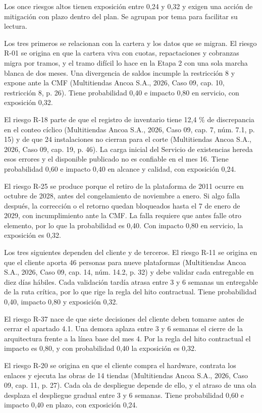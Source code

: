\documentclass[11pt]{article}
\begin{document}
Los once riesgos altos tienen exposición entre 0,24 y 0,32 y exigen una acción de mitigación con plazo dentro del plan. Se agrupan por tema para facilitar su lectura.

Los tres primeros se relacionan con la cartera y los datos que se migran. El riesgo R-01 se origina en que la cartera viva con cuotas, repactaciones y cobranzas migra por tramos, y el tramo difícil lo hace en la Etapa 2 con una sola marcha blanca de dos meses. Una divergencia de saldos incumple la restricción 8 y expone ante la CMF (Multitiendas Ancoa S.A., 2026, Caso 09, cap. 10, restricción 8, p. 26). Tiene probabilidad 0,40 e impacto 0,80 en servicio, con exposición 0,32.

El riesgo R-18 parte de que el registro de inventario tiene 12,4 \% de discrepancia en el conteo cíclico (Multitiendas Ancoa S.A., 2026, Caso 09, cap. 7, núm. 7.1, p. 15) y de que 24 instalaciones no cierran para el corte (Multitiendas Ancoa S.A., 2026, Caso 09, cap. 19, p. 46). La carga inicial del Servicio de existencias hereda esos errores y el disponible publicado no es confiable en el mes 16. Tiene probabilidad 0,60 e impacto 0,40 en alcance y calidad, con exposición 0,24.

El riesgo R-25 se produce porque el retiro de la plataforma de 2011 ocurre en octubre de 2028, antes del congelamiento de noviembre a enero. Si algo falla después, la corrección o el retorno quedan bloqueados hasta el 7 de enero de 2029, con incumplimiento ante la CMF. La falla requiere que antes falle otro elemento, por lo que la probabilidad es 0,40. Con impacto 0,80 en servicio, la exposición es 0,32.

Los tres siguientes dependen del cliente y de terceros. El riesgo R-11 se origina en que el cliente aporta 46 personas para nueve plataformas (Multitiendas Ancoa S.A., 2026, Caso 09, cap. 14, núm. 14.2, p. 32) y debe validar cada entregable en diez días hábiles. Cada validación tardía atrasa entre 3 y 6 semanas un entregable de la ruta crítica, por lo que rige la regla del hito contractual. Tiene probabilidad 0,40, impacto 0,80 y exposición 0,32.

El riesgo R-37 nace de que siete decisiones del cliente deben tomarse antes de cerrar el apartado 4.1. Una demora aplaza entre 3 y 6 semanas el cierre de la arquitectura frente a la línea base del mes 4. Por la regla del hito contractual el impacto es 0,80, y con probabilidad 0,40 la exposición es 0,32.

El riesgo R-20 se origina en que el cliente compra el hardware, contrata los enlaces y ejecuta las obras de 14 tiendas (Multitiendas Ancoa S.A., 2026, Caso 09, cap. 11, p. 27). Cada ola de despliegue depende de ello, y el atraso de una ola desplaza el despliegue gradual entre 3 y 6 semanas. Tiene probabilidad 0,60 e impacto 0,40 en plazo, con exposición 0,24.
\end{document}
